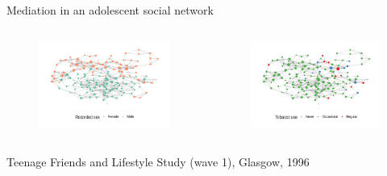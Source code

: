 \documentclass[aspectratio=169]{beamer}
\theoremstyle{remark}
\begin{document}
\begin{frame}{Mediation in an adolescent social network}

    \begin{columns}


        \begin{figure}[ht]
            \raggedleft
            \includegraphics[width=1.05\textwidth]{figures/glasgow/sex.png}
        \end{figure}


        \begin{figure}[ht]
            \raggedright
            \includegraphics[width=1.05\textwidth]{figures/glasgow/tobacco.png}
        \end{figure}
    \end{columns}

    \centering
    \scriptsize Teenage Friends and Lifestyle Study (wave 1), Glasgow, 1996

\end{frame}
\end{document}
